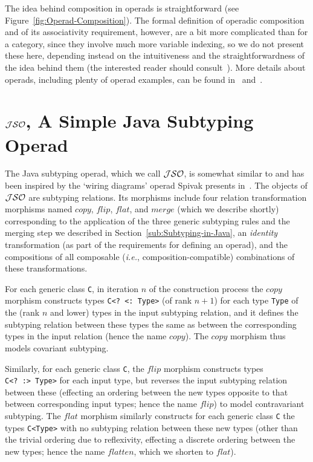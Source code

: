 \documentclass[twocolumn,english]{article}
\numberwithin{equation}{section}
\numberwithin{figure}{section}
\newcommand{\code}[1]{\texttt{#1}}
\begin{document}
The idea behind composition in operads is straightforward (see Figure~\ref{fig:Operad-Composition}).
The formal definition of operadic composition and of its associativity
requirement, however, are a bit more complicated than for a category,
since they involve much more variable indexing, so we do not present
these here, depending instead on the intuitiveness and the straightforwardness
of the idea behind them (the interested reader should consult~\cite[Sec. 7.4]{spivak2014category}).
More details about operads, including plenty of operad examples, can
be found in~\cite{spivak2014category} and~\cite{leinster2004higher}.


\section{\label{sec:JSO}$\protect\mathcal{JSO}$, A Simple Java Subtyping Operad}

The Java subtyping operad, which we call $\mathcal{JSO}$, is somewhat similar
to and has been inspired by the `wiring diagrams' operad Spivak
presents in~\cite{Spivak2013,spivak2014category}. The objects of
$\mathcal{JSO}$ are subtyping relations. Its morphisms include four relation
transformation morphisms named $copy$, $flip$, $flat$, and $merge$
(which we describe shortly) corresponding to the application of the
three generic subtyping rules and the merging step we described in
Section~\ref{sub:Subtyping-in-Java}, an \emph{identity }transformation
(as part of the requirements for defining an operad), and the compositions
of all composable (\emph{i.e.}, composition-compatible) combinations
of these transformations.

For each generic class \code{C}, in iteration $n$ of the construction
process the $copy$ morphism constructs types \code{C<?~<:~Type>}
(of rank $n+1$) for each type \code{Type} of the (rank $n$ and
lower) types in the input subtyping relation, and it defines the subtyping
relation between these types the same as between the corresponding
types in the input relation (hence the name $copy$). The $copy$
morphism thus models covariant subtyping.

Similarly, for each generic class \code{C}, the $flip$ morphism
constructs types \code{C<?~:>~Type>} for each input type, but reverses
the input subtyping relation between these (effecting an ordering
between the new types opposite to that between corresponding input
types; hence the name $flip$) to model contravariant subtyping. The
$flat$ morphism similarly constructs for each generic class \code{C}
the types \code{C<Type>} with no subtyping relation between these
new types (other than the trivial ordering due to reflexivity, effecting
a discrete ordering between the new types; hence the name $flatten$,
which we shorten to $flat$).
\end{document}
